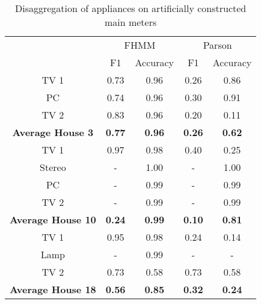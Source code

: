 \begin{table}[H]                             
\centering                                   
\begin{tabular}{c|c|c|c|c|}                 
\cline{2-5}                                      
 & \multicolumn{2}{|c|}{FHMM} & \multicolumn{2}{c|}{Parson} \\                      
\cline{2-5}                                        
 & F1 & Accuracy & F1 & Accuracy \\          
\hline                                       
\multicolumn{1}{|c|}{TV 1 }& 0.73 & 0.96 & 0.26 & 0.86 \\          
\hline                                       
\multicolumn{1}{|c|}{PC} & 0.74 & 0.96 & 0.30 & 0.91 \\            
\hline                                       
\multicolumn{1}{|c|}{TV 2} & 0.83 & 0.96 & 0.20 & 0.11 \\          
\hline                                       
\multicolumn{1}{|c|}{\textbf{Average House 3}} & \textbf{0.77} & \textbf{0.96} & \textbf{0.26} & \textbf{0.62} \\ 
\hline                                       
\multicolumn{1}{|c|}{TV 1} & 0.97 & 0.98 & 0.40 & 0.25 \\          
\hline                                       
\multicolumn{1}{|c|}{Stereo} & - & 1.00 & - & 1.00 \\              
\hline                                       
\multicolumn{1}{|c|}{PC} & - & 0.99 & - & 0.99 \\                  
\hline                                       
\multicolumn{1}{|c|}{TV 2} & - & 0.99 & - & 0.99 \\                
\hline                                       
\multicolumn{1}{|c|}{\textbf{Average House 10}} & \textbf{0.24} & \textbf{0.99} & \textbf{0.10} & \textbf{0.81} \\
\hline                                       
\multicolumn{1}{|c|}{TV 1} & 0.95 & 0.98 & 0.24 & 0.14 \\          
\hline                                       
\multicolumn{1}{|c|}{Lamp} & - & 0.99 & - & - \\                   
\hline                                       
\multicolumn{1}{|c|}{TV 2} & 0.73 & 0.58 & 0.73 & 0.58 \\          
\hline                                       
\multicolumn{1}{|c|}{\textbf{Average House 18}} & \textbf{0.56} & \textbf{0.85} & \textbf{0.32} & \textbf{0.24} \\
\hline                                       
\end{tabular}                                
\caption{Disaggregation of appliances on artificially constructed main meters }                     
\label{table:Tab:SHGSIM}                     
\end{table} 